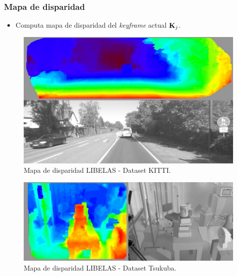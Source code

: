 \documentclass[compress]{beamer}
\begin{document}
\begin{frame}
	\frametitle{Mapa de disparidad}

	\begin{itemize}
		\item Computa mapa de disparidad del \emph{keyframe} actual $\boldsymbol{\mathbf{K}}_{j}$.
	\end{itemize}
	
	\begin{figure}[htb]
		\centering
		\includegraphics[width=0.4\columnwidth]{method/libelas_merge_kitti04_22.jpg}
		\caption{Mapa de disparidad LIBELAS - Dataset KITTI.}
	\end{figure}

	\begin{figure}[htb]
		\centering
		\includegraphics[width=0.4\columnwidth]{method/libelas_merge_tsukuba_222.jpg}
		\caption{Mapa de disparidad LIBELAS - Dataset Tsukuba.}
	\end{figure}

\end{frame}
\end{document}
